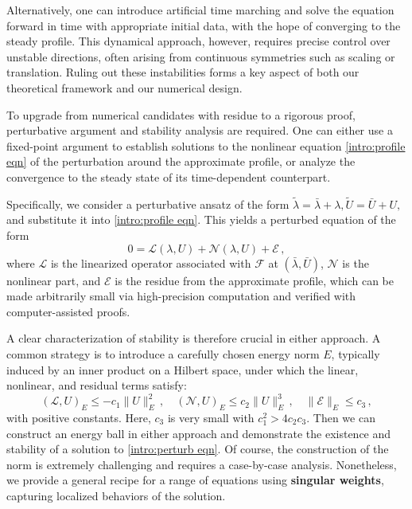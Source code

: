 \documentclass[12pt]{caltech_thesis}
\numberwithin{equation}{section}
\begin{document}
Alternatively, one can introduce artificial time marching and solve the equation forward in time with appropriate initial data,  with the hope of converging to the steady profile. This dynamical approach, however, requires precise control over unstable directions, often arising from continuous symmetries such as scaling or translation. Ruling out these instabilities forms a key aspect of both our theoretical framework and our numerical design.

To upgrade from numerical candidates with residue to a rigorous proof, perturbative argument and stability analysis are required. One can either use a fixed-point argument to establish solutions to the nonlinear equation \eqref{intro:profile eqn} of the perturbation around the approximate profile, or analyze the convergence to the steady state of its time-dependent counterpart. 

Specifically, we consider a perturbative ansatz of the form $\tilde{\lambda}=\bar{\lambda}+\lambda,\tilde{U}=\bar{U}+U,$ and substitute it into  \eqref{intro:profile eqn}. This yields a perturbed equation of the form \begin{equation}
    \label{intro:perturb eqn}
    0=\mathcal{L}(\lambda,U)+\mathcal{N}(\lambda,U)+\mathcal{E}\,,
\end{equation}
where $\mathcal{L}$ is the linearized operator associated with $\mathcal{F}$ at $(\bar{\lambda},\bar{U})$, $\mathcal{N}$ is the nonlinear part, and $\mathcal{E}$ is the residue from the approximate profile, which can be made arbitrarily small via high-precision computation and verified with computer-assisted proofs.

A clear characterization of stability is therefore crucial in either approach. A common strategy is to introduce a carefully chosen energy norm $E$, typically induced by an inner product on a Hilbert space, under which the linear, nonlinear, and residual terms satisfy: \begin{equation}
    \label{intro:framework}(\mathcal{L},U)_E\leq -c_1\|U\|^2_{E}\,,\quad(\mathcal{N},U)_E\leq c_2\|U\|^3_{E}\,,\quad\|\mathcal{E}\|_{E}\leq c_3\,,
\end{equation}
with positive constants. Here, $c_3$ is very small with $c_1^2>4c_2c_3$. Then we can construct an energy ball in either approach and demonstrate the existence and stability of a solution to \eqref{intro:perturb eqn}. Of course, the construction of the norm is extremely challenging and requires a case-by-case analysis. Nonetheless, we provide a general recipe for a range of equations using \textbf{singular weights}, capturing localized behaviors of the solution.
\end{document}

